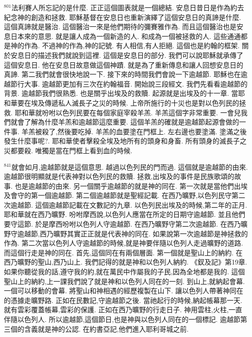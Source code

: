 \documentclass{book}
\begin{document}
$^{801}$法利賽人所忘記的是什麼.
正正這個圖表就是一個總結.
安息日昔日是作為約去紀念神的創造和拯救.
耶穌基督在安息日也重新演繹了這個安息日的真諦是什麼.
這個真諦就是醫治.
這個醫治一來是他們期待的彌賽雅作為.
而且這個醫治也是安息日本來的意思.
就是讓人成為一個新造的人.
和成為一個被拯救的人.
這些通通都是神的作為.
不過神的作為,神的記號.
有人相信,有人拒絕.
這個也是約翰的框架.
關於安息日的描述我們就說到這裡.
這個是安息日的部分.
我們可以說耶穌就承傳了這個安息日.
他在安息日故意做這個神蹟.
就是為了重新傳息和讓人回想安息日的真諦.
第二我們就會很快地說一下.
接下來的時間我們會說一下逾越節.
耶穌也在逾越節行大事.
逾越節更加有三次在約翰福音.
開始說三段經文.
我們先看看逾越節的背景.
逾越節我們很熟悉.
也是關乎出埃及的救贖.
起源就是出埃及的十一章.
當耶和華要在埃及傳遞私人滅長子之災的時候.
上帝所施行的十災也是對以色列民的拯救.
耶和華就吩咐以色列民要在每個家庭宰殺羊羔.
羊羔這個字非常重要.
一會兒我們就會了解為什麼羊羔和逾越節這麼重要.
這個羊羔的確就是逾越節起源會做的一件事.
羊羔被殺了,然後要吃掉.
羊羔的血要塗在門框上.
左右邊也要塗滿.
塗滿之後發生什麼事呢?.
耶和華使者擊殺全埃及地所有的頭身和身畜.
所有頭身的滅長子之災都要殺.
唯獨是當在門框上看到血的時候.

$^{841}$就會如月,逾越節就是這個意思.
越過以色列民的門而過.
這個就是逾越節的由來.
逾越節很明顯就是代表神對以色列民的救贖.
拯救,出埃及的事件是民族歌頌的故事.
也是逾越節的由來.
另一個關乎逾越節的就是神的同在.
第一次就是當他們出埃及會守的第一個逾越節.
第二個逾越節就是聖經記載.
在西乃曠野,以色列民守第二次逾越節.
這個逾越節記載在文數記的九章.
以色列民出埃及的時候,第二年的正月.
耶和華就在西乃曠野.
吩咐摩西說,以色列人應當在所定的日期守逾越節.
並且他們要守這節.
於是摩西吩咐以色列人守逾越節.
在西乃曠野守第二次逾越節.
在西乃曠野守逾越節,西乃曠野其實正正就是代表神的同在.
如果說第一次逾越節是神拯救的作為.
第二次當以色列人守逾越節的時候,就是神要伴隨以色列人走過曠野的道路.
而這個行走是神的同在.
首先,這個同在有兩個層面.
第一個就是聖山上的納約.
在西乃曠野的聖山,西乃山上.
我們記得的就是神和以色列人納約.
《釵及記》第19章.
如果你聽從我的話,遵守我的約,就在萬民中作屬我的子民,因為全地都是我的.
這個聖山上的納約,上一課我們說了就是神和以色列人同在的一刻.
到山上,就納起會幕.
一個可以移動的會幕.
將聖山和神相遇的經歷複製在山下.
讓以色列人帶著神同在的憑據走曠野路.
正如在民數記,守逾越節之後.
當祂起行的時候,納起帳幕那一天.
就有雲彩覆蓋帳幕,雲彩的保護.
正如在西乃曠野的行走日子.
神用雲柱,火柱,一直伴隨以色列人.
所以逾越節,這個節日,也是神與以色列人同在的一個標記.
逾越節第三個的含義就是神的公認.
在約書亞記,他們進入耶利哥城之前.
\end{document}
